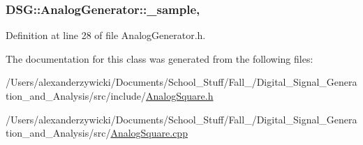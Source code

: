 \hypertarget{classDSG_1_1AnalogGenerator_ac88ad591cac37f636c2f7b460480bef9}{
\subsubsection[{\+\_\+sample}]{ D\+S\+G\+::\+Analog\+Generator\+::\+\_\+sample\hspace{0.3cm}{\ttfamily [protected]}, {\ttfamily [inherited]}}}\label{classDSG_1_1AnalogGenerator_ac88ad591cac37f636c2f7b460480bef9}


Definition at line 28 of file Analog\+Generator.\+h.



The documentation for this class was generated from the following files\+:\begin{DoxyCompactItemize}
\item 
/\+Users/alexanderzywicki/\+Documents/\+School\+\_\+\+Stuff/\+Fall\+\_/\+Digital\+\_\+\+Signal\+\_\+\+Generation\+\_\+and\+\_\+\+Analysis/src/include/\hyperlink{AnalogSquare_8h}{Analog\+Square.\+h}\item 
/\+Users/alexanderzywicki/\+Documents/\+School\+\_\+\+Stuff/\+Fall\+\_/\+Digital\+\_\+\+Signal\+\_\+\+Generation\+\_\+and\+\_\+\+Analysis/src/\hyperlink{AnalogSquare_8cpp}{Analog\+Square.\+cpp}\end{DoxyCompactItemize}
